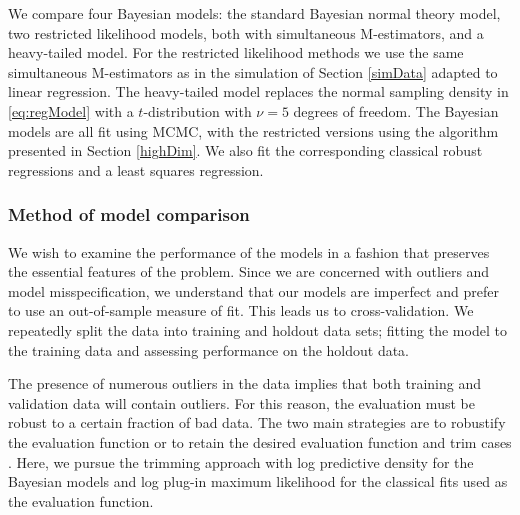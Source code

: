 \documentclass[ba]{imsart}
\begin{document}
We compare four Bayesian models: the standard Bayesian normal theory model, two restricted likelihood models, both with simultaneous M-estimators, and a heavy-tailed model.  For the restricted likelihood methods we use the same simultaneous M-estimators as in the simulation of Section \ref{simData} adapted to linear regression.  The heavy-tailed model replaces the normal sampling density in \eqref{eq:regModel} with a $t$-distribution with $\nu = 5$ degrees of freedom. The Bayesian models are all fit using MCMC, with the restricted versions using the algorithm presented in Section \ref{highDim}.
We also fit the corresponding classical robust regressions and a least squares regression.  

\subsubsection{Method of model comparison}
We wish to examine the performance of the models in a fashion that preserves the essential features of the 
problem.  Since we are concerned with outliers and model 
misspecification, we understand that our models are imperfect and prefer to use an out-of-sample measure of fit.  
This leads us to cross-validation.  We repeatedly split the data into training
and holdout data sets; fitting the model to the training data and assessing performance on the holdout data.  

The presence of numerous outliers in the data implies that both training and validation data will contain 
outliers.  For this reason, the evaluation must be robust to a certain fraction of bad data.  
The two main strategies are to robustify the evaluation function \citep[e.g.,][]{ronchetti1997} or 
to retain the desired evaluation function and trim cases \citep{jung2014}.  Here,
we pursue the trimming approach with log predictive density for the Bayesian models and log plug-in 
maximum likelihood for the classical fits used as the evaluation function.
\end{document}
